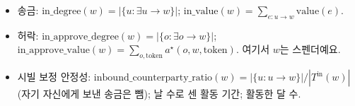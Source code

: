 \begin{itemize}
\item 송금: $\mathrm{in\_degree}(w)=|\{u:\exists u\to w\}|$; $\mathrm{in\_value}(w)=\sum_{e:u\to w}\mathrm{value}(e)$.

\item 허락: $\mathrm{in\_approve\_degree}(w)=|\{o:\exists o\to w\}|$;\newline $\mathrm{in\_approve\_value}(w)=\sum_{o,\mathrm{token}} a^{\star}(o,w,\mathrm{token})$. 여기서 $w$는 스펜더예요.

\item 시빌 보정 안정성: $\mathrm{inbound\_counterparty\_ratio}(w)=|\{u:u\to w\}|/|T^{\mathrm{in}}(w)|$(자기 자신에게 보낸 송금은 뺌); 날 수로 센 활동 기간; 활동한 달 수.
\end{itemize}


